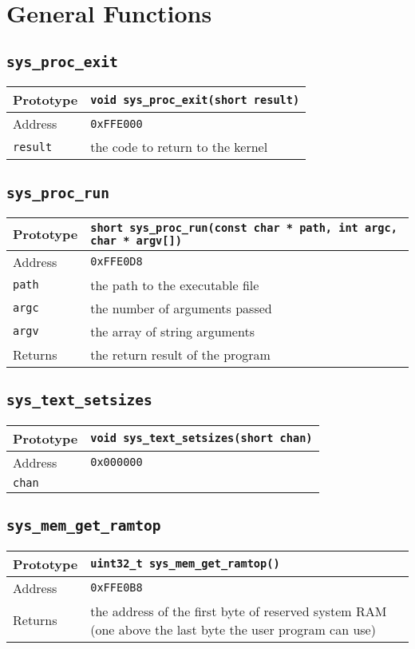 \section{General Functions}

\subsection*{\texttt{sys\_proc\_exit}}
\begin{tabular}{|l||l|} \hline
Prototype & \lstinline!void sys_proc_exit(short result)! \\ \hline
Address & \texttt{0xFFE000} \\ \hline
\lstinline!result! & the code to return to the kernel \\ \hline
\end{tabular}

\subsection*{\texttt{sys\_proc\_run}}
\begin{tabular}{|l||l|} \hline
Prototype & \lstinline!short sys_proc_run(const char * path, int argc, char * argv[])! \\ \hline
Address & \texttt{0xFFE0D8} \\ \hline
\lstinline!path! & the path to the executable file \\ \hline
\lstinline!argc! & the number of arguments passed \\ \hline
\lstinline!argv! & the array of string arguments \\ \hline
Returns & the return result of the program \\ \hline
\end{tabular}

\subsection*{\texttt{sys\_text\_setsizes}}
\begin{tabular}{|l||l|} \hline
Prototype & \lstinline!void sys_text_setsizes(short chan)! \\ \hline
Address & \texttt{0x000000} \\ \hline
\lstinline!chan! &  \\ \hline
\end{tabular}

\subsection*{\texttt{sys\_mem\_get\_ramtop}}
\begin{tabular}{|l||l|} \hline
Prototype & \lstinline!uint32_t sys_mem_get_ramtop()! \\ \hline
Address & \texttt{0xFFE0B8} \\ \hline
Returns & the address of the first byte of reserved system RAM (one above the last byte the user program can use) \\ \hline
\end{tabular}

